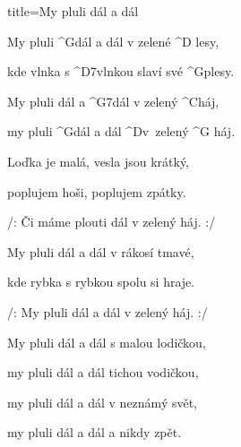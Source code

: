 \begin{song}{title=\predtitle\centering My pluli dál a dál \vspace*{-0.3cm}}  %
\begin{centerjustified}
\nejvetsi

\sloka
	My pluli ^{G}dál a dál v zelené ^{D\,\,}lesy,

	kde vlnka s ^{D7\z }vlnkou slaví své ^{G\z }plesy.

	My pluli dál a ^{G7}dál v zelený ^{C}háj,

	my pluli ^{G}dál a dál ^{D\z}v~zelený ^{G\,\,}háj.

\sloka
	Loďka je malá, vesla jsou krátký,

	poplujem hoši, poplujem zpátky.

	/: Či máme plouti dál v zelený háj. :/

\sloka
	 My pluli dál a dál v rákosí tmavé,

	kde rybka s rybkou spolu si hraje.

	/: My pluli dál a dál v zelený háj. :/

\sloka
	My pluli dál a dál s malou lodičkou,

	my pluli dál a dál tichou vodičkou,

	my pluli dál a dál v neznámý svět,

	my pluli dál a dál a nikdy zpět.

\end{centerjustified}
\setcounter{Slokočet}{0}
\end{song}
